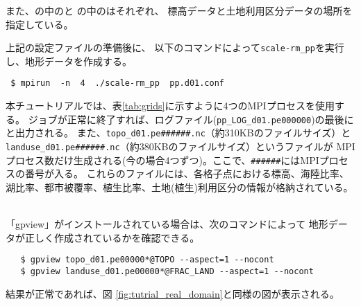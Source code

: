 また、の中のと
の中のはそれぞれ、
標高データと土地利用区分データの場所を指定している。


上記の設定ファイルの準備後に、
以下のコマンドによって\verb|scale-rm_pp|を実行し、地形データを作成する。
\begin{verbatim}
 $ mpirun  -n  4  ./scale-rm_pp  pp.d01.conf
\end{verbatim}
本チュートリアルでは、表\ref{tab:grids}に示すように4つのMPIプロセスを使用する。
ジョブが正常に終了すれば、ログファイル(\verb|pp_LOG_d01.pe000000|)の最後に
と出力される。
また、\verb|topo_d01.pe######.nc|（約310KBのファイルサイズ）と\\
\verb|landuse_d01.pe######.nc|（約380KBのファイルサイズ）というファイルが
MPIプロセス数だけ生成される(今の場合4つずつ)。ここで、\verb|######|にはMPIプロセスの番号が入る。
これらのファイルには、各格子点における標高、海陸比率、湖比率、都市被覆率、植生比率、土地(植生)利用区分の情報が格納されている。


 \vspace{1cm}
  \hrulefill \\
 「gpview」がインストールされている場合は、次のコマンドによって
 地形データが正しく作成されているかを確認できる。
 \begin{verbatim}
   $ gpview topo_d01.pe00000*@TOPO --aspect=1 --nocont
   $ gpview landuse_d01.pe00000*@FRAC_LAND --aspect=1 --nocont
 \end{verbatim}
 結果が正常であれば、図 \ref{fig:tutrial_real_domain}と同様の図が表示される。
